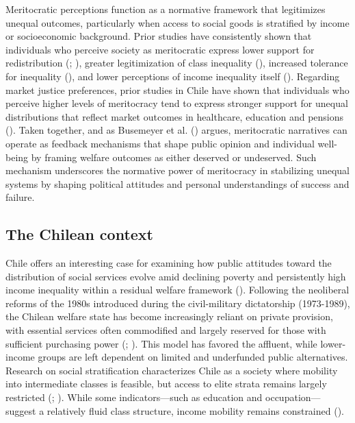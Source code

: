 \documentclass[
  12pt,
]{article}
\begin{document}
Meritocratic perceptions function as a normative framework that
legitimizes unequal outcomes, particularly when access to social goods
is stratified by income or socioeconomic background. Prior studies have
consistently shown that individuals who perceive society as meritocratic
express lower support for redistribution
(;
), greater legitimization of class inequality
(), increased
tolerance for inequality (), and lower perceptions of income inequality itself
().
Regarding market justice preferences, prior studies in Chile have shown
that individuals who perceive higher levels of meritocracy tend to
express stronger support for unequal distributions that reflect market
outcomes in healthcare, education and pensions
().
Taken together, and as Busemeyer et al.
() argues, meritocratic
narratives can operate as feedback mechanisms that shape public opinion
and individual well-being by framing welfare outcomes as either deserved
or undeserved. Such mechanism underscores the normative power of
meritocracy in stabilizing unequal systems by shaping political
attitudes and personal understandings of success and failure.

\subsection{The Chilean context}\label{the-chilean-context}

Chile offers an interesting case for examining how public attitudes
toward the distribution of social services evolve amid declining poverty
and persistently high income inequality within a residual welfare
framework (). Following
the neoliberal reforms of the 1980s introduced during the civil-military
dictatorship (1973-1989), the Chilean welfare state has become
increasingly reliant on private provision, with essential services often
commodified and largely reserved for those with sufficient purchasing
power (;
). This model has
favored the affluent, while lower-income groups are left dependent on
limited and underfunded public alternatives. Research on social
stratification characterizes Chile as a society where mobility into
intermediate classes is feasible, but access to elite strata remains
largely restricted
(; ).
While some indicators---such as education and occupation---suggest a
relatively fluid class structure, income mobility remains constrained
().
\end{document}
